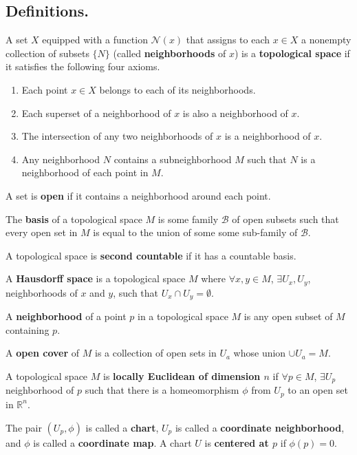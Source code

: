\documentclass[12pt]{article}
\newcommand{\R}{\mathbb{R}}
\begin{document}
\subsection{Definitions.}
\par{A set $X$ equipped with a function
$\mathcal{N}(x)$ that assigns to each $x \in X$ a
nonempty collection of subsets $\{N\}$ (called
\textbf{neighborhoods} of $x$) is a \textbf{topological
space} if it satisfies the following four axioms.}
\begin{enumerate}
    \item Each point $x \in X$  belongs to each of
    its neighborhoods.
    \item Each superset of a neighborhood of $x$
    is also a neighborhood of $x$.
    \item The intersection of any two
    neighborhoods of $x$ is a neighborhood of $x$.
    \item Any neighborhood $N$ contains a
    subneighborhood $M$ such that $N$ is a
    neighborhood of each point in $M$.
\end{enumerate}
\par{A set is \textbf{open} if it contains a
neighborhood around each point.}
\par{The \textbf{basis} of a topological space $M$ is some
family $\mathcal{B}$ of open subsets such that
every open set in $M$ is equal to the union of
some some sub-family of $\mathcal{B}$.}
\par{A topological space is \textbf{second countable}
if it has a countable basis.}
\par{A \textbf{Hausdorff space} is a topological space $M$
where $\forall x, y \in M$, $\exists U_x, U_y$,
neighborhoods of $x$ and $y$, such that $U_x \cap
U_y = \emptyset$.}
\par{A \textbf{neighborhood} of a point $p$ in a topological
space $M$ is any open subset of $M$ containing
$p$.}
\par{A \textbf{open cover} of $M$ is a collection of
open sets in ${U_a}$ whose union $\cup U_a = M$.}
\par{A topological space $M$ is \textbf{locally Euclidean of
dimension $n$} if $\forall p \in M$, $\exists U_p$
neighborhood of $p$ such that there is a
homeomorphism $\phi$ from $U_p$ to an open set in
$\R^n$.}
\par{The pair $(U_p, \phi)$ is called a \textbf{chart}, $U_p$
is called a \textbf{coordinate neighborhood}, and
$\phi$ is called a \textbf{coordinate map}.
A chart $U$ is \textbf{centered at $p$} if
$\phi(p) = 0$.}
\end{document}
